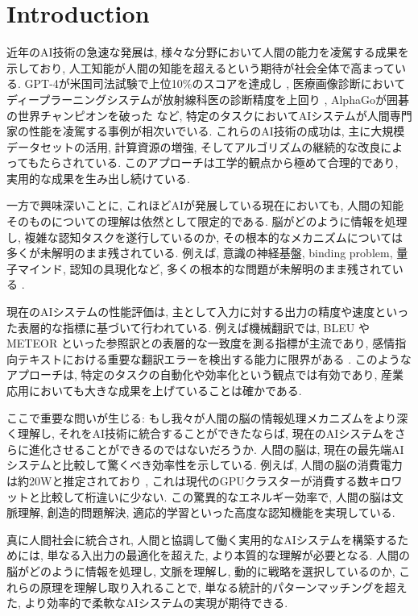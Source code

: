 \section{Introduction}

近年のAI技術の急速な発展は, 様々な分野において人間の能力を凌駕する成果を示しており, 人工知能が人間の知能を超えるという期待が社会全体で高まっている. 
GPT-4が米国司法試験で上位10\%のスコアを達成し \cite{openai2023gpt4}, 医療画像診断においてディープラーニングシステムが放射線科医の診断精度を上回り \cite{rajpurkar2017chexnet}, AlphaGoが囲碁の世界チャンピオンを破った \cite{silver2016mastering} など, 特定のタスクにおいてAIシステムが人間専門家の性能を凌駕する事例が相次いでいる. 
これらのAI技術の成功は, 主に大規模データセットの活用, 計算資源の増強, そしてアルゴリズムの継続的な改良によってもたらされている. 
このアプローチは工学的観点から極めて合理的であり, 実用的な成果を生み出し続けている. 

一方で興味深いことに, これほどAIが発展している現在においても, 人間の知能そのものについての理解は依然として限定的である. 
脳がどのように情報を処理し, 複雑な認知タスクを遂行しているのか, その根本的なメカニズムについては多くが未解明のまま残されている. 
例えば, 意識の神経基盤, binding problem, 量子マインド, 認知の具現化など, 多くの根本的な問題が未解明のまま残されている \cite{list2020unsolved}. 

現在のAIシステムの性能評価は, 主として入力に対する出力の精度や速度といった表層的な指標に基づいて行われている. 
例えば機械翻訳では, BLEU \cite{papineni2002bleu} やMETEOR \cite{banerjee2005meteor} といった参照訳との表層的な一致度を測る指標が主流であり, 感情指向テキストにおける重要な翻訳エラーを検出する能力に限界がある \cite{saadany2021bleu}. 
このようなアプローチは, 特定のタスクの自動化や効率化という観点では有効であり, 産業応用においても大きな成果を上げていることは確かである. 

ここで重要な問いが生じる: もし我々が人間の脳の情報処理メカニズムをより深く理解し, それをAI技術に統合することができたならば, 現在のAIシステムをさらに進化させることができるのではないだろうか. 
人間の脳は, 現在の最先端AIシステムと比較して驚くべき効率性を示している. 
例えば, 人間の脳の消費電力は約20Wと推定されており \cite{clarke2008energy}, これは現代のGPUクラスターが消費する数キロワットと比較して桁違いに少ない. 
この驚異的なエネルギー効率で, 人間の脳は文脈理解, 創造的問題解決, 適応的学習といった高度な認知機能を実現している. 

真に人間社会に統合され, 人間と協調して働く実用的なAIシステムを構築するためには, 単なる入出力の最適化を超えた, より本質的な理解が必要となる. 
人間の脳がどのように情報を処理し, 文脈を理解し, 動的に戦略を選択しているのか, これらの原理を理解し取り入れることで, 単なる統計的パターンマッチングを超えた, より効率的で柔軟なAIシステムの実現が期待できる. 


